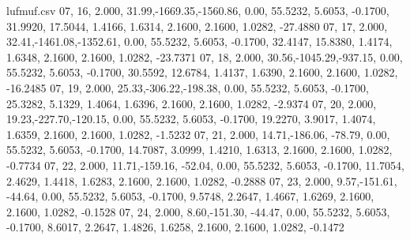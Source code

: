 \begin{filecontents*}{lufmuf.csv}
07, 16,    2.000,  31.99,-1669.35,-1560.86,   0.00,  55.5232,   5.6053,  -0.1700,  31.9920,  17.5044,   1.4166,   1.6314,   2.1600,   2.1600,   1.0282, -27.4880
07, 17,    2.000,  32.41,-1461.08,-1352.61,   0.00,  55.5232,   5.6053,  -0.1700,  32.4147,  15.8380,   1.4174,   1.6348,   2.1600,   2.1600,   1.0282, -23.7371
07, 18,    2.000,  30.56,-1045.29,-937.15,   0.00,  55.5232,   5.6053,  -0.1700,  30.5592,  12.6784,   1.4137,   1.6390,   2.1600,   2.1600,   1.0282, -16.2485
07, 19,    2.000,  25.33,-306.22,-198.38,   0.00,  55.5232,   5.6053,  -0.1700,  25.3282,   5.1329,   1.4064,   1.6396,   2.1600,   2.1600,   1.0282,  -2.9374
07, 20,    2.000,  19.23,-227.70,-120.15,   0.00,  55.5232,   5.6053,  -0.1700,  19.2270,   3.9017,   1.4074,   1.6359,   2.1600,   2.1600,   1.0282,  -1.5232
07, 21,    2.000,  14.71,-186.06, -78.79,   0.00,  55.5232,   5.6053,  -0.1700,  14.7087,   3.0999,   1.4210,   1.6313,   2.1600,   2.1600,   1.0282,  -0.7734
07, 22,    2.000,  11.71,-159.16, -52.04,   0.00,  55.5232,   5.6053,  -0.1700,  11.7054,   2.4629,   1.4418,   1.6283,   2.1600,   2.1600,   1.0282,  -0.2888
07, 23,    2.000,   9.57,-151.61, -44.64,   0.00,  55.5232,   5.6053,  -0.1700,   9.5748,   2.2647,   1.4667,   1.6269,   2.1600,   2.1600,   1.0282,  -0.1528
07, 24,    2.000,   8.60,-151.30, -44.47,   0.00,  55.5232,   5.6053,  -0.1700,   8.6017,   2.2647,   1.4826,   1.6258,   2.1600,   2.1600,   1.0282,  -0.1472
\end{filecontents*}
